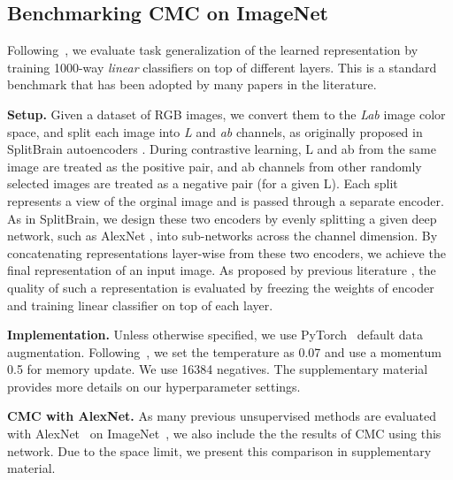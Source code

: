 \documentclass[10pt,twocolumn,letterpaper]{article}
\newcommand{\header}[1]{\vspace{0.05in}\noindent\textbf{#1}}
\newcommand{\citep}[1]{\cite{#1}}
\begin{document}
\subsection{Benchmarking CMC on ImageNet}\label{sec:imagenet}

Following~\cite{zhang2016colorful}, we evaluate task generalization of the learned representation by training 1000-way \emph{linear} classifiers on top of different layers. This is a standard benchmark that has been adopted by many papers in the literature.

\header{Setup.} Given a dataset of RGB images, we convert them to the \emph{Lab} image color space, and split each image into \emph{L} and \emph{ab} channels, as originally proposed in SplitBrain autoencoders \cite{zhang2017split}. During contrastive learning, L and ab from the same image are treated as the positive pair, and ab channels from other randomly selected images are treated as a negative pair (for a given L). Each split represents a view of the orginal image and is passed through a separate encoder. As in SplitBrain, we design these two encoders by evenly splitting a given deep network, such as AlexNet \citep{krizhevsky2012imagenet}, into sub-networks across the channel dimension. By concatenating representations layer-wise from these two encoders, we achieve the final representation of an input image. As proposed by previous literature \citep{oord2018representation,hjelm2018learning,arora2019theoretical,zhuang2019local,wu2018unsupervised}, the quality of such a representation is evaluated by freezing the weights of encoder and training linear classifier on top of each layer.

\header{Implementation.} Unless otherwise specified, we use PyTorch~\cite{paszke2019pytorch} default data augmentation. Following~\cite{wu2018unsupervised}, we set the temperature  as 0.07 and use a momentum 0.5 for memory update. We use 16384 negatives. The supplementary material provides more details on our hyperparameter settings.




\header{CMC with AlexNet.} As many previous unsupervised methods
are evaluated with AlexNet~\cite{krizhevsky2012imagenet} on ImageNet~\cite{deng2009imagenet,krahenbuhl2015data,doersch2015unsupervised,zhang2016colorful,noroozi2016unsupervised,donahue2016adversarial,zhang2017split,noroozi2017representation,gidaris2018unsupervised,caron2018deep,zhang2019aet}, we also include the the results of CMC using this network. Due to the space limit, we present this comparison in supplementary material.
\end{document}
